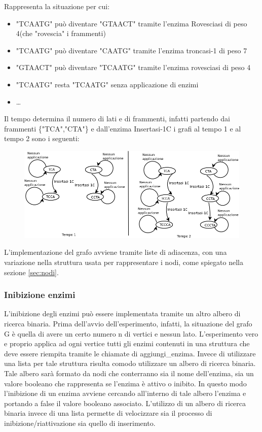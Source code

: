 \documentclass[a4paper,10pt]{article}
\begin{document}
Rappresenta la situazione per cui:
\begin{itemize}\item "TCAATG" può diventare "GTAACT" tramite l'enzima Rovesciasi di peso 4(che "rovescia" i frammenti) \item "TCAATG" può diventare "CAATG" tramite l'enzima troncasi-1 di peso 7
\item "GTAACT" può diventare "TCAATG" tramite l'enzima rovesciasi di peso 4
\item "TCAATG" resta "TCAATG" senza applicazione di enzimi
\item \dots
\end{itemize}
Il tempo determina il numero di lati e di frammenti, infatti partendo dai frammenti \{"TCA","CTA"\} e dall'enzima Insertasi-1C i grafi al tempo 1 e al tempo 2 sono i seguenti:
\begin{figure}[htop]
\centering\includegraphics[scale=0.5]{graph2.png}\end{figure}


L'implementazione del grafo avviene tramite liste di adiacenza, con una variazione nella struttura usata per rappresentare i nodi, come spiegato nella sezione \ref{sec:nodi}.

\subsubsection{Inibizione enzimi}
L'inibizione degli enzimi può essere implementata tramite un altro albero di ricerca binaria. Prima dell'avvio dell'esperimento, infatti, la situazione del grafo G è quella di avere un certo numero n di vertici e nessun lato. L'esperimento vero e proprio applica ad ogni vertice tutti gli enzimi contenuti in una struttura che deve essere riempita tramite le chiamate di aggiungi\_enzima. Invece di utilizzare una lista per tale struttura risulta comodo utilizzare un albero di ricerca binaria. Tale albero sarà formato da nodi che conterranno sia il nome dell'enzima, sia un valore booleano che rappresenta se l'enzima è attivo o inibito. In questo modo l'inibizione di un enzima avviene cercando all'interno di tale albero l'enzima e portando a false il valore booleano associato. L'utilizzo di un albero di ricerca binaria invece di una lista permette di velocizzare sia il processo di inibizione/riattivazione sia quello di inserimento.
\end{document}
